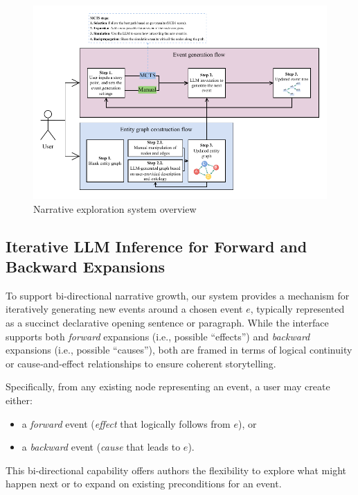\documentclass[11pt]{article}
\begin{document}
\begin{figure}[t]
  \centering
  \includegraphics[width=\textwidth]{figures/main-diagram.pdf}
  \caption{Narrative exploration system overview}
  \label{fig:narrative-exploration-system}
\end{figure}

\subsection{Iterative LLM Inference for Forward and Backward Expansions}

To support bi-directional narrative growth, our system provides a mechanism for iteratively generating new events around a chosen event $ e $, typically represented as a succinct declarative opening sentence or paragraph. While the interface supports both \emph{forward} expansions (i.e., possible ``effects'') and \emph{backward} expansions (i.e., possible ``causes''), both are framed in terms of logical continuity or cause‐and‐effect relationships to ensure coherent storytelling.

Specifically, from any existing node representing an event, a user may create either:
\begin{itemize}
    \item a \emph{forward} event (\emph{effect} that logically follows from $ e $), or
    \item a \emph{backward} event (\emph{cause} that leads to \( e \)).
\end{itemize}
This bi-directional capability offers authors the flexibility to explore what might happen next or to expand on existing preconditions for an event.
\end{document}
